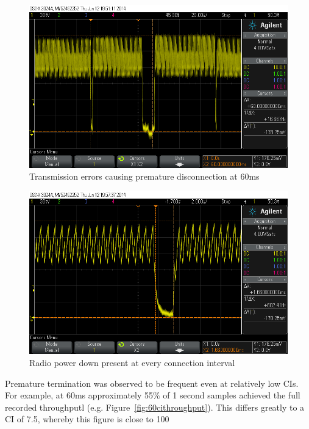 \documentclass[]{article}
\begin{document}
\begin{figure}[H]
	\begin{center}
		\includegraphics[width = \textwidth]{60ci}
	\end{center}
	\caption{Transmission errors causing premature disconnection at 60ms}
	\label{fig:60ci}
\end{figure}

\begin{figure}[H]
	\begin{center}
		\includegraphics[width = \textwidth]{cilimit}
	\end{center}
	\caption{Radio power down present at every connection interval}
	\label{fig:cilimit}
\end{figure}

Premature termination was observed to be frequent even at relatively low \ac{CI}s. For example, at 60ms approximately 55$\%$ of 1 second samples achieved the full recorded throughputl   (e.g. Figure~\ref{fig:60cithroughput}). This differs greatly to a \ac{CI} of 7.5, whereby this figure is close to 100%
\end{document}
